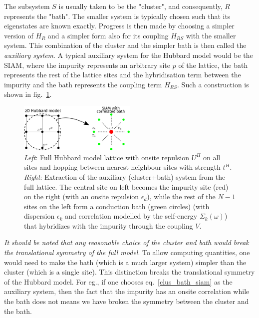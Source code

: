 \documentclass[reprint,hidelinks]{revtex4-2}
\begin{document}
The subsystem \(S\) is usually taken to be the "cluster", and consequently, \(R\) represents the "bath".
The smaller system is typically chosen such that its eigenstates are known exactly.
Progress is then made by choosing a simpler version of \(H_R\) and a simpler form also for its coupling \(H_{RS}\) with the smaller system.
This combination of the cluster and the simpler bath is then called the \textit{auxiliary system}.
A typical auxiliary system for the Hubbard model would be the SIAM, where the impurity represents an arbitrary site \(p\) of the lattice, the bath represents the rest of the lattice sites and the hybridisation term between the impurity and the bath represents the coupling term \(H_{RS}\).
Such a construction is shown in fig.~\ref{cluster-bath}.
\begin{figure}[!htb]
	\centering
	\includegraphics[width=0.5\textwidth]{cluster-bath.pdf}
	\caption{\textit{Left}: Full Hubbard model lattice with onsite repulsion $U^H$ on all sites and hopping between nearest neighbour sites with strength $t^H$. \textit{Right}: Extraction of the auxiliary (cluster+bath) system from the full lattice. The central site on left becomes the impurity site (red) on the right (with an onsite repulsion $\epsilon_d$), while the rest of the $N-1$ sites on the left form a conduction bath (green circles) (with dispersion $\epsilon_k$ and correlation modelled by the self-energy $\Sigma_k(\omega)$) that hybridizes with the impurity through the coupling $V$.}
	\label{cluster-bath}
\end{figure}
\textit{It should be noted that any reasonable choice of the cluster and bath would break the translational symmetry of the full model}. To allow computing quantities, one would need to make the bath (which is a much larger system) simpler than the cluster (which is a single site). This distinction breaks the translational symmetry of the Hubbard model. For eg., if one chooses eq.~\ref{clus_bath_siam} as the auxiliary system, then the fact that the impurity has an onsite correlation while the bath does not means we have broken the symmetry between the cluster and the bath.
\end{document}
